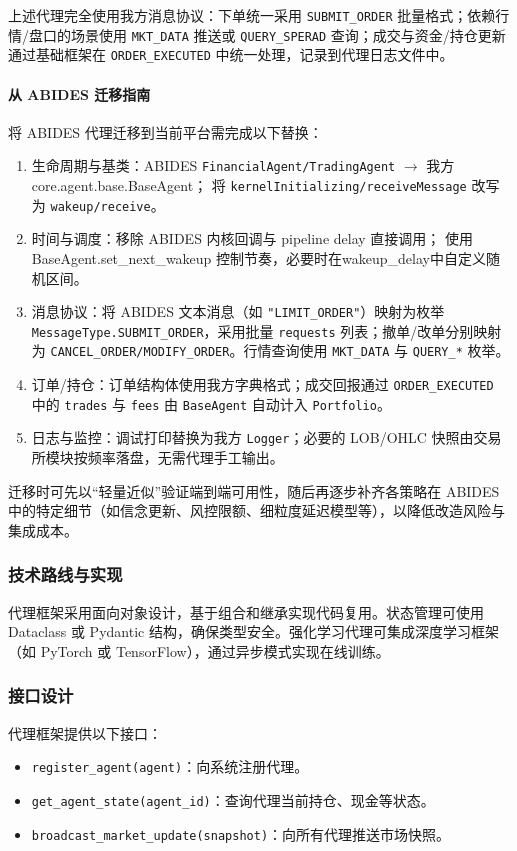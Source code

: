 上述代理完全使用我方消息协议：下单统一采用 \verb|SUBMIT_ORDER| 批量格式；依赖行情/盘口的场景使用 \verb|MKT_DATA| 推送或 \verb|QUERY_SPERAD| 查询；成交与资金/持仓更新通过基础框架在 \verb|ORDER_EXECUTED| 中统一处理，记录到代理日志文件中。

\paragraph{从 ABIDES 迁移指南}
将 ABIDES 代理迁移到当前平台需完成以下替换：
\begin{enumerate}
  \item 生命周期与基类：ABIDES \verb|FinancialAgent/TradingAgent| $\rightarrow$ 我方 core.agent.base.BaseAgent；
  将 \verb|kernelInitializing/receiveMessage| 改写为 \verb|wakeup/receive|。
  \item 时间与调度：移除 ABIDES 内核回调与 pipeline delay 直接调用；
  使用 BaseAgent.set\_next\_wakeup 控制节奏，必要时在wakeup\_delay中自定义随机区间。
  \item 消息协议：将 ABIDES 文本消息（如 \verb|"LIMIT_ORDER"|）映射为枚举 \verb|MessageType.SUBMIT_ORDER|，采用批量 \verb|requests| 列表；撤单/改单分别映射为 \verb|CANCEL_ORDER/MODIFY_ORDER|。行情查询使用 \verb|MKT_DATA| 与 \verb|QUERY_*| 枚举。
  \item 订单/持仓：订单结构体使用我方字典格式；成交回报通过 \verb|ORDER_EXECUTED| 中的 \verb|trades| 与 \verb|fees| 由 \verb|BaseAgent| 自动计入 \verb|Portfolio|。
  \item 日志与监控：调试打印替换为我方 \verb|Logger|；必要的 LOB/OHLC 快照由交易所模块按频率落盘，无需代理手工输出。
\end{enumerate}

迁移时可先以“轻量近似”验证端到端可用性，随后再逐步补齐各策略在 ABIDES 中的特定细节（如信念更新、风控限额、细粒度延迟模型等），以降低改造风险与集成成本。

\subsubsection{技术路线与实现}
代理框架采用面向对象设计，基于组合和继承实现代码复用。状态管理可使用 Dataclass 或 Pydantic 结构，确保类型安全。强化学习代理可集成深度学习框架（如 PyTorch 或 TensorFlow），通过异步模式实现在线训练。

\subsubsection{接口设计}
代理框架提供以下接口：
\begin{itemize}
  \item \verb|register_agent(agent)|：向系统注册代理。
  \item \verb|get_agent_state(agent_id)|：查询代理当前持仓、现金等状态。
  \item \verb|broadcast_market_update(snapshot)|：向所有代理推送市场快照。
\end{itemize}

